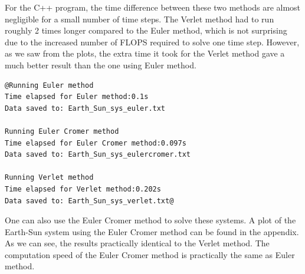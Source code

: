 \documentclass[12pt]{article}
\begin{document}
For the C++ program, the time difference between these two methods are almost negligible for a small number of time steps. The Verlet method had to run roughly 2 times longer compared to the Euler method, which is not surprising due to the increased number of FLOPS required to solve one time step. However, as we saw from the plots, the extra time it took for the Verlet method gave a much better result than the one using Euler method.

\begin{lstlisting}
@Running Euler method
Time elapsed for Euler method:0.1s
Data saved to: Earth_Sun_sys_euler.txt

Running Euler Cromer method
Time elapsed for Euler Cromer method:0.097s
Data saved to: Earth_Sun_sys_eulercromer.txt

Running Verlet method
Time elapsed for Verlet method:0.202s
Data saved to: Earth_Sun_sys_verlet.txt@
\end{lstlisting}

One can also use the Euler Cromer method to solve these systems. A plot of the Earth-Sun system using the Euler Cromer method can be found in the appendix. As we can see, the results practically identical to the Verlet method. The computation speed of the Euler Cromer method is practically the same as Euler method.
\end{document}
